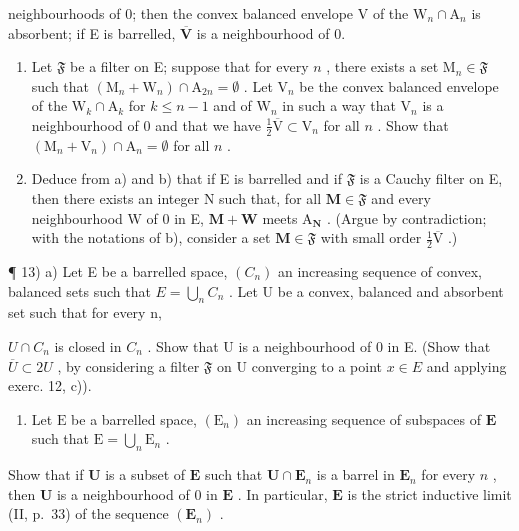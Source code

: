 neighbourhoods of 0; then the convex balanced envelope V of the \(\mathrm{W}_n\cap \mathrm{A}_n\) is absorbent; if E is barrelled, \(\overline{\mathbf{V}}\) is a neighbourhood of 0.

\begin{enumerate}
\def\labelenumi{\alph{enumi})}
\setcounter{enumi}{1}
\item
  Let \(\mathfrak{F}\) be a filter on E; suppose that for every \(n\) , there exists a set \(\mathrm{M}_n \in \mathfrak{F}\) such that \((\mathrm{M}_n + \mathrm{W}_n) \cap \mathrm{A}_{2n} = \emptyset\) . Let \(\mathrm{V}_n\) be the convex balanced envelope of the \(\mathrm{W}_k \cap \mathrm{A}_k\) for \(k \leqslant n - 1\) and of \(\mathrm{W}_n\) in such a way that \(\mathrm{V}_n\) is a neighbourhood of 0 and that we have \(\frac{1}{2}\overline{\mathrm{V}} \subset \mathrm{V}_n\) for all \(n\) . Show that \((\mathrm{M}_n + \mathrm{V}_n) \cap \mathrm{A}_n = \emptyset\) for all \(n\) .
\item
  Deduce from a) and b) that if E is barrelled and if \(\mathfrak{F}\) is a Cauchy filter on E, then there exists an integer N such that, for all \(\mathbf{M} \in \mathfrak{F}\) and every neighbourhood W of 0 in E, \(\mathbf{M} + \mathbf{W}\) meets \(\mathrm{A}_{\mathbf{N}}\) . (Argue by contradiction; with the notations of b), consider a set \(\mathbf{M} \in \mathfrak{F}\) with small order \(\frac{1}{2}\overline{\mathrm{V}}\) .)
\end{enumerate}

¶ 13) a) Let E be a barrelled space, \((C_n)\) an increasing sequence of convex, balanced sets such that \(E = \bigcup_{n} C_n\) . Let U be a convex, balanced and absorbent set such that for every n,

\(U \cap C_{n}\) is closed in \(C_{n}\) . Show that U is a neighbourhood of 0 in E. (Show that \(\overline{U} \subset 2U\) , by considering a filter \(\mathfrak{F}\) on U converging to a point \(x \in E\) and applying exerc. 12, c)).

\begin{enumerate}
\def\labelenumi{\alph{enumi})}
\setcounter{enumi}{1}
\tightlist
\item
  Let \(\mathrm{E}\) be a barrelled space, \((\mathrm{E}_n)\) an increasing sequence of subspaces of \(\mathbf{E}\) such that \(\mathrm{E} = \bigcup_{n} \mathrm{E}_n\) .
\end{enumerate}

Show that if \(\mathbf{U}\) is a subset of \(\mathbf{E}\) such that \(\mathbf{U} \cap \mathbf{E}_n\) is a barrel in \(\mathbf{E}_n\) for every \(n\) , then \(\mathbf{U}\) is a neighbourhood of 0 in \(\mathbf{E}\) . In particular, \(\mathbf{E}\) is the strict inductive limit (II, p.~33) of the sequence \((\mathbf{E}_n)\) .

